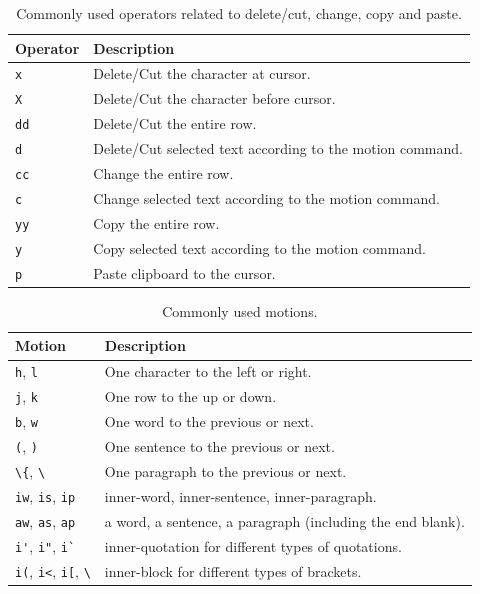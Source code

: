 \begin{table}
  \centering \caption{Commonly used operators related to delete/cut, change, copy and paste.}\label{ch4tab:deletecut}
  \begin{tabularx}{\textwidth}{lX}
    \hline
    Operator & Description \\ \hline
    \verb|x| & Delete/Cut the character at cursor. \\ \hdashline
    \verb|X| & Delete/Cut the character before cursor. \\ \hdashline
    \verb|dd| & Delete/Cut the entire row. \\ \hdashline
    \verb|d| & Delete/Cut selected text according to the motion command. \\ \hdashline
    \verb|cc| & Change the entire row. \\ \hdashline
    \verb|c| & Change selected text according to the motion command. \\ \hdashline
    \verb|yy| & Copy the entire row. \\ \hdashline
    \verb|y| & Copy selected text according to the motion command. \\ \hdashline
    \verb|p| & Paste clipboard to the cursor. \\
    \hline
  \end{tabularx}
\end{table}

\begin{table}
  \centering \caption{Commonly used motions.}\label{ch4tab:motion}
  \begin{tabularx}{\textwidth}{lX}
    \hline
    Motion & Description \\ \hline
    \verb|h|, \verb|l| & One character to the left or right. \\ \hdashline
    \verb|j|, \verb|k| & One row to the up or down. \\ \hdashline
    \verb|b|, \verb|w| & One word to the previous or next. \\ \hdashline
    \verb|(|, \verb|)| & One sentence to the previous or next. \\ \hdashline
    \lstinline{\{}, \lstinline{\}} & One paragraph to the previous or next. \\ \hdashline
    \verb|iw|, \verb|is|, \verb|ip| & inner-word, inner-sentence, inner-paragraph. \\ \hdashline
    \verb|aw|, \verb|as|, \verb|ap| & a word, a sentence, a paragraph (including the end blank). \\ \hdashline
    \verb|i'|, \verb|i"|, \verb|i`| & inner-quotation for different types of quotations. \\ \hdashline
    \verb|i(|, \verb|i<|, \verb|i[|, \lstinline{\}} & inner-block for different types of brackets. \\
    \hline
  \end{tabularx}
\end{table}

